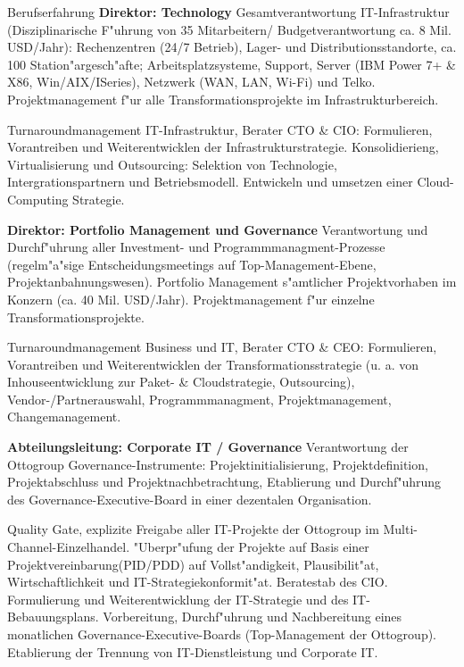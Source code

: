 \begin{rubric}{Berufserfahrung}
\entry*[04/2013 - heute] \textbf{Direktor: Technology}\newline
{} 
Gesamtverantwortung IT-Infrastruktur (Disziplinarische F"uhrung von 35 Mitarbeitern/ Budgetverantwortung ca. 8 Mil. USD/Jahr): Rechenzentren (24/7 Betrieb), Lager- und Distributionsstandorte, ca. 100 Station"argesch"afte; Arbeitsplatzsysteme, Support, Server (IBM Power 7+ \& X86, Win/AIX/ISeries), Netzwerk (WAN, LAN, Wi-Fi) und Telko. Projektmanagement f"ur alle Transformationsprojekte im Infrastrukturbereich.

Turnaroundmanagement IT-Infrastruktur, Berater CTO \& CIO: Formulieren, Vorantreiben und Weiterentwicklen der Infrastrukturstrategie. Konsolidierieng, Virtualisierung und Outsourcing: Selektion von Technologie, Intergrationspartnern und Betriebsmodell. Entwickeln und umsetzen einer Cloud-Computing Strategie.

\entry*[10/2011 - 03/2013] \textbf{Direktor: Portfolio Management und Governance}\newline
{} 
Verantwortung und Durchf"uhrung aller Investment- und Programmmanagment-Prozesse (regelm"a"sige Entscheidungsmeetings auf Top-Management-Ebene, Projektanbahnungswesen). Portfolio Management s"amtlicher Projektvorhaben im Konzern (ca. 40 Mil. USD/Jahr). Projektmanagement f"ur einzelne Transformationsprojekte.\axelvspace

Turnaroundmanagement Business und IT, Berater CTO \& CEO: Formulieren, Vorantreiben und Weiterentwicklen der Transformationsstrategie (u. a. von Inhouseentwicklung zur Paket- \& Cloudstrategie, Outsourcing), Vendor-/Partnerauswahl, Programmmanagment, Projektmanagement, Changemanagement.\newline

\pagebreak
{}
\entry*[08/2009 - 10/2011] \textbf{Abteilungsleitung: Corporate IT / Governance}\newline
{} 
Verantwortung der Ottogroup Governance-Instrumente: Projektinitialisierung, Projektdefinition, Projektabschluss und Projektnachbetrachtung, Etablierung und Durchf"uhrung des Governance-Executive-Board in einer dezentalen Organisation.\axelvspace

Quality Gate, explizite Freigabe aller IT-Projekte der Ottogroup im Multi-Channel-Einzelhandel. "Uberpr"ufung der Projekte auf Basis einer Projektvereinbarung(PID/PDD) auf Vollst"andigkeit, Plausibilit"at, Wirtschaftlichkeit und IT-Strategiekonformit"at. Beratestab des CIO. Formulierung und Weiterentwicklung der IT-Strategie und des IT-Bebauungsplans. Vorbereitung, Durchf"uhrung und Nachbereitung eines monatlichen Governance-Executive-Boards (Top-Management der Ottogroup). Etablierung der Trennung von IT-Dienstleistung und Corporate IT.


\end{rubric}
